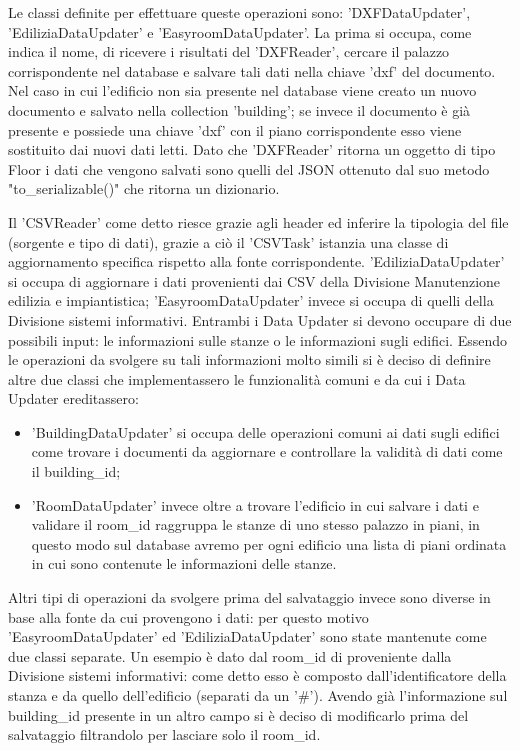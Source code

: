 \documentclass[12pt]{report}
\begin{document}
\vspace{5mm} %

Le classi definite per effettuare queste operazioni sono: 'DXFDataUpdater', 'EdiliziaDataUpdater' e 'EasyroomDataUpdater'. 
La prima si occupa, come indica il nome, di ricevere i risultati del 'DXFReader', cercare il palazzo corrispondente nel database e salvare tali dati nella chiave 'dxf' del documento. 
Nel caso in cui l'edificio non sia presente nel database viene creato un nuovo documento e salvato nella collection 'building'; se invece il documento è già presente e possiede una chiave 'dxf' con il piano corrispondente esso viene sostituito dai nuovi dati letti.
Dato che 'DXFReader' ritorna un oggetto di tipo Floor i dati che vengono salvati sono quelli del JSON ottenuto dal suo metodo "to\_serializable()" che ritorna un dizionario. 

Il 'CSVReader' come detto riesce grazie agli header ed inferire la tipologia del file (sorgente e tipo di dati), grazie a ciò il 'CSVTask' istanzia una classe di aggiornamento specifica rispetto alla fonte corrispondente.
'EdiliziaDataUpdater' si occupa di aggiornare i dati provenienti dai CSV della Divisione Manutenzione edilizia e impiantistica; 'EasyroomDataUpdater' invece si occupa di quelli della Divisione sistemi informativi.
Entrambi i Data Updater si devono occupare di due possibili input: le informazioni sulle stanze o le informazioni sugli edifici.
Essendo le operazioni da svolgere su tali informazioni molto simili si è deciso di definire altre due classi che implementassero le funzionalità comuni e da cui i Data Updater ereditassero:
\begin{itemize}
\item 'BuildingDataUpdater' si occupa delle operazioni comuni ai dati sugli edifici come trovare i documenti da aggiornare e controllare la validità di dati come il building\_id;
\item 'RoomDataUpdater' invece oltre a trovare l'edificio in cui salvare i dati e validare il room\_id raggruppa le stanze di uno stesso palazzo in piani, in questo modo sul database avremo per ogni edificio una lista di piani ordinata in cui sono contenute le informazioni delle stanze.
\end{itemize}
Altri tipi di operazioni da svolgere prima del salvataggio invece sono diverse in base alla fonte da cui provengono i dati: per questo motivo 'EasyroomDataUpdater' ed 'EdiliziaDataUpdater' sono state mantenute come due classi separate.
Un esempio è dato dal room\_id di proveniente dalla Divisione sistemi informativi: come detto esso è composto dall'identificatore della stanza e da quello dell'edificio (separati da un '\#'). Avendo già l'informazione sul building\_id presente in un altro campo si è deciso di modificarlo prima del salvataggio filtrandolo per lasciare solo il room\_id.
 
\end{document}
